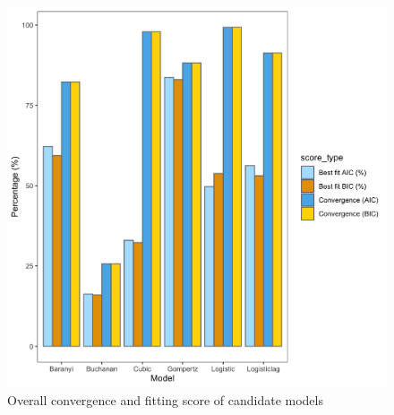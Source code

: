 \documentclass[a4paper,11pt]{article}
\theoremstyle{definition}
\begin{document}
\begin{linenumbers}
\begin{center}
\begin{table}[]
\begin{threeparttable}
 \begin{tablenotes}
        \footnotesize
        \item[] 
      \end{tablenotes}
    \end{threeparttable}
\end{table}
\end{center}
\begin{center}
\begin{figure}[!ht]
            \centering
                \begin{center}
                     \includegraphics[width=\linewidth]{../results/stats.png}
                     \caption{Overall convergence and fitting score of candidate models}
                \end{center}
        \end{figure}
\begin{figure}[!ht]
            \centering
                \begin{center}

\end{center}
\end{figure}
\end{center}
\end{linenumbers}
\end{document}
